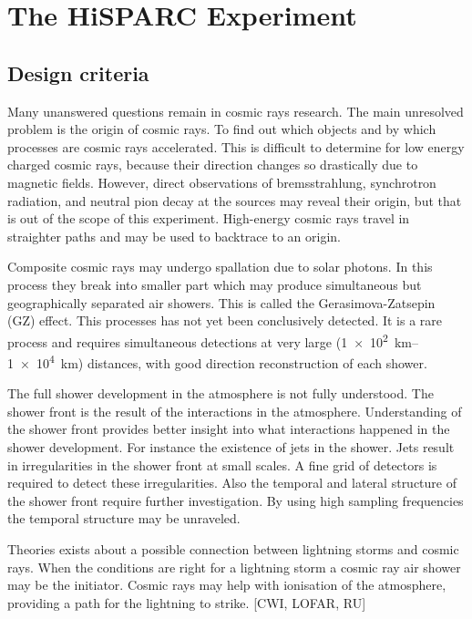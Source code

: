 \chapter{The HiSPARC Experiment}

\section{Design criteria}

Many unanswered questions remain in cosmic rays research. The main unresolved problem is the origin of cosmic rays. To find out which objects and by which processes are cosmic rays accelerated. This is difficult to determine for low energy charged cosmic rays, because their direction changes so drastically due to magnetic fields. However, direct observations of bremsstrahlung, synchrotron radiation, and neutral pion decay at the sources may reveal their origin, but that is out of the scope of this experiment. High-energy cosmic rays travel in straighter paths and may be used to backtrace to an origin.

Composite cosmic rays may undergo spallation due to solar photons. In this process they break into smaller part which may produce simultaneous but geographically separated air showers. This is called the Gerasimova-Zatsepin (GZ) effect. This processes has not yet been conclusively detected. It is a rare process and requires simultaneous detections at very large (\SIrange{1e2}{1e4}{\kilo\meter}) distances, with good direction reconstruction of each shower.

The full shower development in the atmosphere is not fully understood. The shower front is the result of the interactions in the atmosphere. Understanding of the shower front provides better insight into what interactions happened in the shower development. For instance the existence of jets in the shower. Jets result in irregularities in the shower front at small scales. A fine grid of detectors is required to detect these irregularities. Also the temporal and lateral structure of the shower front require further investigation. By using high sampling frequencies the temporal structure may be unraveled.

Theories exists about a possible connection between lightning storms and cosmic rays. When the conditions are right for a lightning storm a cosmic ray air shower may be the initiator. Cosmic rays may help with ionisation of the atmosphere, providing a path for the lightning to strike. [CWI, LOFAR, RU]

